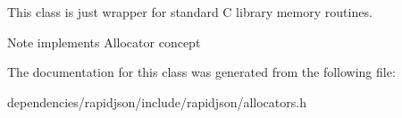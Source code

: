 This class is just wrapper for standard C library memory routines. \begin{DoxyNote}{Note}
implements Allocator concept 
\end{DoxyNote}


The documentation for this class was generated from the following file\+:\begin{DoxyCompactItemize}
\item 
dependencies/rapidjson/include/rapidjson/allocators.\+h\end{DoxyCompactItemize}
